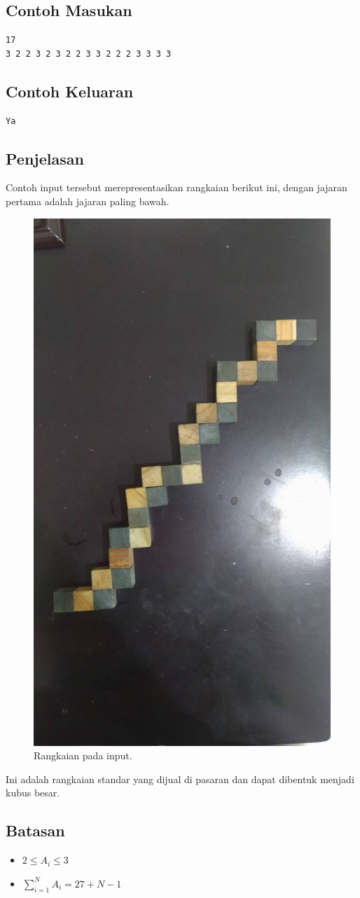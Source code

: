 \documentclass{article}
\begin{document}
\subsection*{Contoh Masukan}

\begin{lstlisting}
17
3 2 2 3 2 3 2 2 3 3 2 2 2 3 3 3 3
\end{lstlisting}

\subsection*{Contoh Keluaran}

\begin{lstlisting}
Ya
\end{lstlisting}

\subsection*{Penjelasan}

\par\noindent Contoh input tersebut merepresentasikan rangkaian berikut ini, dengan jajaran pertama adalah jajaran paling bawah.

\begin{figure}[h!]
	\centering
	\includegraphics[width=0.2\linewidth]{sample-input.jpg}
  \caption{Rangkaian pada input.}
\end{figure}

\par\noindent Ini adalah rangkaian standar yang dijual di pasaran dan dapat dibentuk menjadi kubus besar.

\subsection*{Batasan}

\begin{itemize}
	\item $2 \leq A_i \leq 3$
	\item $\sum_{i=1}^{N} A_i = 27 + N - 1$
\end{itemize}
\end{document}
